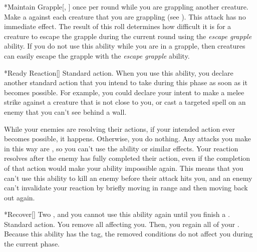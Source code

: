   \begin{activeability}*{Maintain Grapple}[, ]
    \abilityusagetime {} once per round while you are grappling another creature.
    \rankline
    Make a  against each creature that you are grappling (see ).
    This attack has no immediate effect.
    The result of this roll determines how difficult it is for a creature to escape the grapple during the current round using the \textit{escape grapple} ability.
    If you do not use this ability while you are in a grapple, then creatures can easily escape the grapple with the \textit{escape grapple} ability.
  \end{activeability}

  \begin{activeability}*{Ready Reaction}[\atSwift]
    \abilityusagetime Standard action.
    \rankline
    When you use this ability, you declare another standard action that you intend to take during this phase as soon as it becomes possible.
    For example, you could declare your intent to make a melee strike against a creature that is not close to you, or cast a targeted spell on an enemy that you can't see behind a wall.

    While your enemies are resolving their actions, if your intended action ever becomes possible, it happens.
    Otherwise, you do nothing.
    Any attacks you make in this way are , so you can't use the  ability or similar effects.
    Your reaction resolves after the enemy has fully completed their action, even if the completion of that action would make your ability impossible again.
    This means that you can't use this ability to kill an enemy before their attack hits you, and an enemy can't invalidate your reaction by briefly moving in range and then moving back out again.
  \end{activeability}

  \begin{activeability}*{Recover}[]
    \abilitycost Two , and you cannot use this ability again until you finish a .
    \abilityusagetime Standard action.
    \rankline
    You remove all  affecting you.
    Then, you regain all of your .
    Because this ability has the  tag, the removed conditions do not affect you during the current phase.
  \end{activeability}

